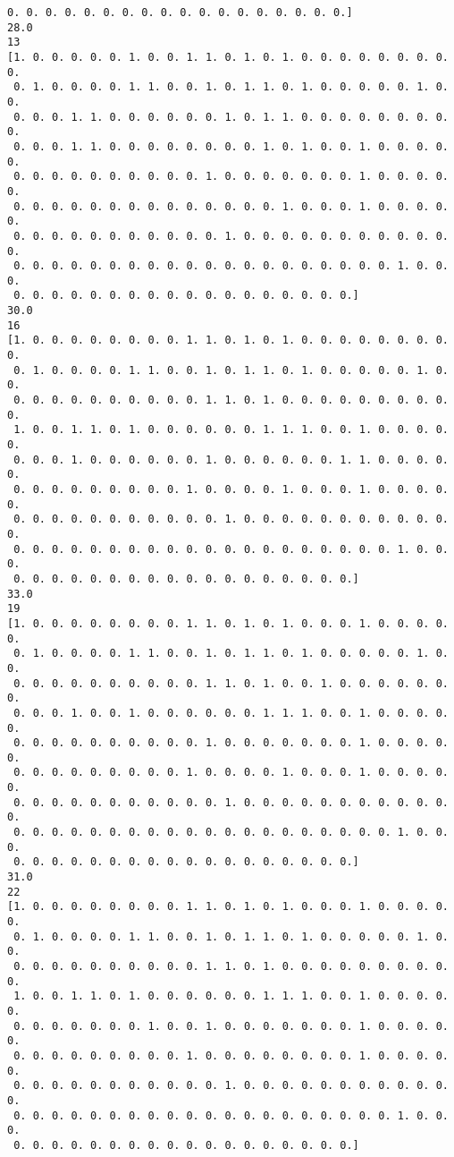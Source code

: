 \documentclass[11pt]{article}
\begin{document}
\begin{Verbatim}[commandchars=\\\{\}]
 0. 0. 0. 0. 0. 0. 0. 0. 0. 0. 0. 0. 0. 0. 0. 0. 0. 0.]
28.0
13
[1. 0. 0. 0. 0. 0. 1. 0. 0. 1. 1. 0. 1. 0. 1. 0. 0. 0. 0. 0. 0. 0. 0. 0.
 0. 1. 0. 0. 0. 0. 1. 1. 0. 0. 1. 0. 1. 1. 0. 1. 0. 0. 0. 0. 0. 1. 0. 0.
 0. 0. 0. 1. 1. 0. 0. 0. 0. 0. 0. 1. 0. 1. 1. 0. 0. 0. 0. 0. 0. 0. 0. 0.
 0. 0. 0. 1. 1. 0. 0. 0. 0. 0. 0. 0. 0. 1. 0. 1. 0. 0. 1. 0. 0. 0. 0. 0.
 0. 0. 0. 0. 0. 0. 0. 0. 0. 0. 1. 0. 0. 0. 0. 0. 0. 0. 1. 0. 0. 0. 0. 0.
 0. 0. 0. 0. 0. 0. 0. 0. 0. 0. 0. 0. 0. 0. 1. 0. 0. 0. 1. 0. 0. 0. 0. 0.
 0. 0. 0. 0. 0. 0. 0. 0. 0. 0. 0. 1. 0. 0. 0. 0. 0. 0. 0. 0. 0. 0. 0. 0.
 0. 0. 0. 0. 0. 0. 0. 0. 0. 0. 0. 0. 0. 0. 0. 0. 0. 0. 0. 0. 1. 0. 0. 0.
 0. 0. 0. 0. 0. 0. 0. 0. 0. 0. 0. 0. 0. 0. 0. 0. 0. 0.]
30.0
16
[1. 0. 0. 0. 0. 0. 0. 0. 0. 1. 1. 0. 1. 0. 1. 0. 0. 0. 0. 0. 0. 0. 0. 0.
 0. 1. 0. 0. 0. 0. 1. 1. 0. 0. 1. 0. 1. 1. 0. 1. 0. 0. 0. 0. 0. 1. 0. 0.
 0. 0. 0. 0. 0. 0. 0. 0. 0. 0. 1. 1. 0. 1. 0. 0. 0. 0. 0. 0. 0. 0. 0. 0.
 1. 0. 0. 1. 1. 0. 1. 0. 0. 0. 0. 0. 0. 1. 1. 1. 0. 0. 1. 0. 0. 0. 0. 0.
 0. 0. 0. 1. 0. 0. 0. 0. 0. 0. 1. 0. 0. 0. 0. 0. 0. 1. 1. 0. 0. 0. 0. 0.
 0. 0. 0. 0. 0. 0. 0. 0. 0. 1. 0. 0. 0. 0. 1. 0. 0. 0. 1. 0. 0. 0. 0. 0.
 0. 0. 0. 0. 0. 0. 0. 0. 0. 0. 0. 1. 0. 0. 0. 0. 0. 0. 0. 0. 0. 0. 0. 0.
 0. 0. 0. 0. 0. 0. 0. 0. 0. 0. 0. 0. 0. 0. 0. 0. 0. 0. 0. 0. 1. 0. 0. 0.
 0. 0. 0. 0. 0. 0. 0. 0. 0. 0. 0. 0. 0. 0. 0. 0. 0. 0.]
33.0
19
[1. 0. 0. 0. 0. 0. 0. 0. 0. 1. 1. 0. 1. 0. 1. 0. 0. 0. 1. 0. 0. 0. 0. 0.
 0. 1. 0. 0. 0. 0. 1. 1. 0. 0. 1. 0. 1. 1. 0. 1. 0. 0. 0. 0. 0. 1. 0. 0.
 0. 0. 0. 0. 0. 0. 0. 0. 0. 0. 1. 1. 0. 1. 0. 0. 1. 0. 0. 0. 0. 0. 0. 0.
 0. 0. 0. 1. 0. 0. 1. 0. 0. 0. 0. 0. 0. 1. 1. 1. 0. 0. 1. 0. 0. 0. 0. 0.
 0. 0. 0. 0. 0. 0. 0. 0. 0. 0. 1. 0. 0. 0. 0. 0. 0. 0. 1. 0. 0. 0. 0. 0.
 0. 0. 0. 0. 0. 0. 0. 0. 0. 1. 0. 0. 0. 0. 1. 0. 0. 0. 1. 0. 0. 0. 0. 0.
 0. 0. 0. 0. 0. 0. 0. 0. 0. 0. 0. 1. 0. 0. 0. 0. 0. 0. 0. 0. 0. 0. 0. 0.
 0. 0. 0. 0. 0. 0. 0. 0. 0. 0. 0. 0. 0. 0. 0. 0. 0. 0. 0. 0. 1. 0. 0. 0.
 0. 0. 0. 0. 0. 0. 0. 0. 0. 0. 0. 0. 0. 0. 0. 0. 0. 0.]
31.0
22
[1. 0. 0. 0. 0. 0. 0. 0. 0. 1. 1. 0. 1. 0. 1. 0. 0. 0. 1. 0. 0. 0. 0. 0.
 0. 1. 0. 0. 0. 0. 1. 1. 0. 0. 1. 0. 1. 1. 0. 1. 0. 0. 0. 0. 0. 1. 0. 0.
 0. 0. 0. 0. 0. 0. 0. 0. 0. 0. 1. 1. 0. 1. 0. 0. 0. 0. 0. 0. 0. 0. 0. 0.
 1. 0. 0. 1. 1. 0. 1. 0. 0. 0. 0. 0. 0. 1. 1. 1. 0. 0. 1. 0. 0. 0. 0. 0.
 0. 0. 0. 0. 0. 0. 0. 1. 0. 0. 1. 0. 0. 0. 0. 0. 0. 0. 1. 0. 0. 0. 0. 0.
 0. 0. 0. 0. 0. 0. 0. 0. 0. 1. 0. 0. 0. 0. 0. 0. 0. 0. 1. 0. 0. 0. 0. 0.
 0. 0. 0. 0. 0. 0. 0. 0. 0. 0. 0. 1. 0. 0. 0. 0. 0. 0. 0. 0. 0. 0. 0. 0.
 0. 0. 0. 0. 0. 0. 0. 0. 0. 0. 0. 0. 0. 0. 0. 0. 0. 0. 0. 0. 1. 0. 0. 0.
 0. 0. 0. 0. 0. 0. 0. 0. 0. 0. 0. 0. 0. 0. 0. 0. 0. 0.]

\end{Verbatim}
\end{document}
